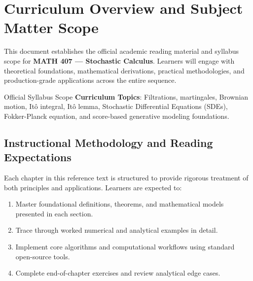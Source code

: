 \section{Curriculum Overview and Subject Matter Scope}

This document establishes the official academic reading material and syllabus scope for \textbf{MATH 407 --- Stochastic Calculus}. Learners will engage with theoretical foundations, mathematical derivations, practical methodologies, and production-grade applications across the entire sequence.

\begin{InsightBox}{Official Syllabus Scope}
  \textbf{Curriculum Topics}: Filtrations, martingales, Brownian motion, Itô integral, Itô lemma, Stochastic Differential Equations (SDEs), Fokker-Planck equation, and score-based generative modeling foundations.
\end{InsightBox}

\subsection{Instructional Methodology and Reading Expectations}

Each chapter in this reference text is structured to provide rigorous treatment of both principles and applications. Learners are expected to:
\begin{enumerate}
  \item Master foundational definitions, theorems, and mathematical models presented in each section.
  \item Trace through worked numerical and analytical examples in detail.
  \item Implement core algorithms and computational workflows using standard open-source tools.
  \item Complete end-of-chapter exercises and review analytical edge cases.
\end{enumerate}


